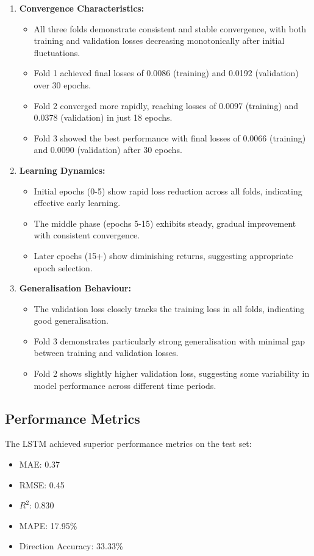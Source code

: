 \documentclass[12pt,a4paper]{report}
\begin{document}
\begin{enumerate}
    \item \textbf{Convergence Characteristics:}
    \begin{itemize}
        \item All three folds demonstrate consistent and stable convergence, with both training and validation losses decreasing monotonically after initial fluctuations.
        \item Fold 1 achieved final losses of 0.0086 (training) and 0.0192 (validation) over 30 epochs.
        \item Fold 2 converged more rapidly, reaching losses of 0.0097 (training) and 0.0378 (validation) in just 18 epochs.
        \item Fold 3 showed the best performance with final losses of 0.0066 (training) and 0.0090 (validation) after 30 epochs.
    \end{itemize}

    \item \textbf{Learning Dynamics:}
    \begin{itemize}
        \item Initial epochs (0-5) show rapid loss reduction across all folds, indicating effective early learning.
        \item The middle phase (epochs 5-15) exhibits steady, gradual improvement with consistent convergence.
        \item Later epochs (15+) show diminishing returns, suggesting appropriate epoch selection.
    \end{itemize}

    \item \textbf{Generalisation Behaviour:}
    \begin{itemize}
        \item The validation loss closely tracks the training loss in all folds, indicating good generalisation.
        \item Fold 3 demonstrates particularly strong generalisation with minimal gap between training and validation losses.
        \item Fold 2 shows slightly higher validation loss, suggesting some variability in model performance across different time periods.
    \end{itemize}
\end{enumerate}

\subsection{Performance Metrics}
The LSTM achieved superior performance metrics on the test set:
\begin{itemize}
    \item MAE: 0.37
    \item RMSE: 0.45
    \item $R^2$: 0.830
    \item MAPE: 17.95\%
    \item Direction Accuracy: 33.33\%
\end{itemize}
\end{document}
